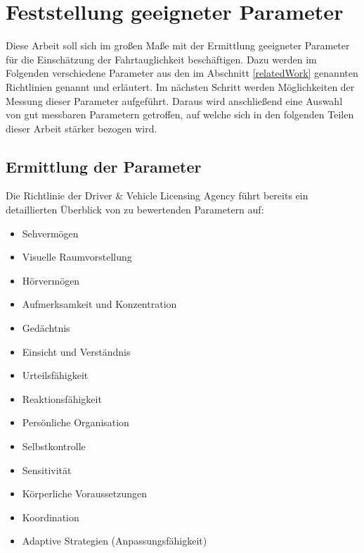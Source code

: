 \section{Feststellung geeigneter Parameter}
\label{parameters}

Diese Arbeit soll sich im großen Maße mit der Ermittlung geeigneter Parameter für die Einschätzung der Fahrtauglichkeit beschäftigen. Dazu werden im Folgenden verschiedene Parameter aus den im Abschnitt \ref{relatedWork} genannten Richtlinien genannt und erläutert. Im nächsten Schritt werden Möglichkeiten der Messung dieser Parameter aufgeführt. Daraus wird anschließend eine Auswahl von gut messbaren Parametern getroffen, auf welche sich in den folgenden Teilen dieser Arbeit stärker bezogen wird.
\subsection{Ermittlung der Parameter}

Die Richtlinie der Driver \& Vehicle Licensing Agency \cite{drivervehiclelicencingagency} führt bereits ein detaillierten Überblick von zu bewertenden Parametern auf:

\begin{flushleft}
	\begin{multicols}{2}
		\begin{itemize}
			\item Sehvermögen
			\item Visuelle Raumvorstellung
			\item Hörvermögen
			\item Aufmerksamkeit und Konzentration
			\item Gedächtnis
			\item Einsicht und Verständnis
			\item Urteilsfähigkeit
			\item Reaktionsfähigkeit
			\item Persönliche Organisation
			\item Selbstkontrolle
			\item Sensitivität
			\item Körperliche Voraussetzungen
			\item Koordination
			\item Adaptive Strategien (Anpassungsfähigkeit)
		\end{itemize}
	\end{multicols}
\end{flushleft}

